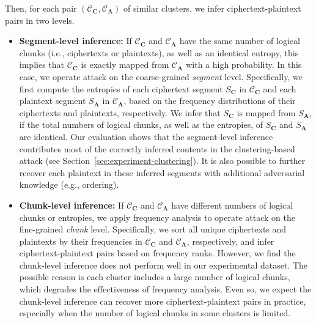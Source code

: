 \documentclass[bachelor]{thesis-uestc}
\begin{document}
Then, for each pair $(\mathcal{C}_\mathbf{C}, \mathcal{C}_\mathbf{A})$ of similar clusters, we infer ciphertext-plaintext pairs in two levels. 
\begin{itemize}[leftmargin=*]
    \item {\bf Segment-level inference:}
        If $\mathcal{C}_\mathbf{C}$ and $\mathcal{C}_\mathbf{A}$ have the same number of logical chunks (i.e., ciphertexts or plaintexts), as well as an identical entropy, this implies that $\mathcal{C}_\mathbf{C}$ is exactly mapped from $\mathcal{C}_\mathbf{A}$ with a high probability. In this case, we operate attack on the coarse-grained {\em segment} level. Specifically, we first compute the entropies of each ciphertext segment $S_\mathbf{C}$ in $\mathcal{C}_\mathbf{C}$ and each plaintext segment $S_\mathbf{A}$ in $\mathcal{C}_\mathbf{A}$, based on the frequency distributions of their ciphertexts and plaintexts, respectively. 
         We infer that $S_\mathbf{C}$ is mapped from  $S_\mathbf{A}$, if the total numbers of logical chunks, as well as the entropies, of $S_\mathbf{C}$ and $S_\mathbf{A}$ are identical. Our evaluation shows that the segment-level inference contributes most of the correctly inferred contents in the
        clustering-based attack (see
        Section~\ref{sec:experiment-clustering}). It is also possible to further recover each plaintext in these inferred segments with additional adversarial knowledge (e.g., ordering). 

        
    \item {\bf Chunk-level inference:}
        If $\mathcal{C}_\mathbf{C}$ and $\mathcal{C}_\mathbf{A}$ have different numbers of logical chunks or entropies, we apply frequency analysis to operate attack on the fine-grained {\em chunk} level. Specifically, we sort all unique ciphertexts and plaintexts by their frequencies in $\mathcal{C}_\mathbf{C}$ and $\mathcal{C}_\mathbf{A}$, respectively, and infer ciphertext-plaintext pairs based on frequency ranks.  
        However, we find the chunk-level inference does not perform well in our experimental dataset. The possible reason is each cluster includes a large number of logical chunks, which degrades the effectiveness of  frequency analysis. Even so, we expect the chunk-level inference can recover more ciphertext-plaintext pairs in practice, especially when the number of logical chunks in some clusters is limited.   
\end{itemize}
\end{document}
